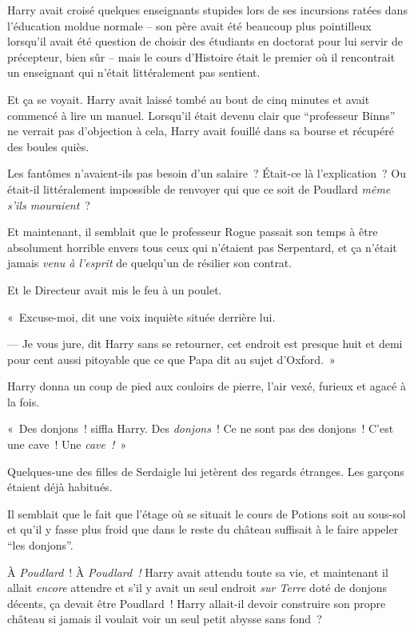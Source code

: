 Harry avait croisé quelques enseignants stupides lors de ses incursions ratées dans l'éducation moldue normale -- son père avait été beaucoup plus pointilleux lorsqu'il avait été question de choisir des étudiants en doctorat pour lui servir de précepteur, bien sûr -- mais le cours d'Histoire était le premier où il rencontrait un enseignant qui n'était littéralement pas sentient.

Et ça se voyait.
Harry avait laissé tombé au bout de cinq minutes et avait commencé à lire un manuel.
Lorsqu'il était devenu clair que “professeur Binns” ne verrait pas d'objection à cela, Harry avait fouillé dans sa bourse et récupéré des boules quiès.

Les fantômes n'avaient-ils pas besoin d'un salaire~?
Était-ce là l'explication~?
Ou était-il littéralement impossible de renvoyer qui que ce soit de Poudlard \emph{même s'ils mouraient}~?

Et maintenant, il semblait que le professeur Rogue passait son temps à être absolument horrible envers tous ceux qui n'étaient pas Serpentard, et ça n'était jamais \emph{venu à l'esprit} de quelqu'un de résilier son contrat.

Et le Directeur avait mis le feu à un poulet.

«~Excuse-moi, dit une voix inquiète située derrière lui.

--- Je vous jure, dit Harry sans se retourner, cet endroit est presque huit et demi pour cent aussi pitoyable que ce que Papa dit au sujet d'Oxford.~»

\later

Harry donna un coup de pied aux couloirs de pierre, l'air vexé, furieux et agacé à la fois.

«~Des donjons~! siffla Harry.
Des \emph{donjons}~!
Ce ne sont pas des donjons~!
C'est une cave~!
Une \emph{cave~!}~»

Quelques-une des filles de Serdaigle lui jetèrent des regards étranges.
Les garçons étaient déjà habitués.

Il semblait que le fait que l'étage où se situait le cours de Potions soit au sous-sol et qu'il y fasse plus froid que dans le reste du château suffisait à le faire appeler “les donjons”.

À \emph{Poudlard}~!
À \emph{Poudlard~!} Harry avait attendu toute sa vie, et maintenant il allait \emph{encore} attendre et s'il y avait un seul endroit \emph{sur Terre} doté de donjons décents, ça devait être Poudlard~!
Harry allait-il devoir construire son propre château si jamais il voulait voir un seul petit abysse sans fond~?

